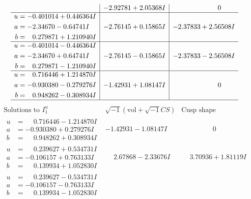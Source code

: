 \documentclass[1p]{elsarticle_modified}
\theoremstyle{definition}
\newcommand{\I}{\sqrt{-1}}
\begin{document}
$$\begin{array}{c|c|c}
 & -2.92781 + 2.05368 I & \phantom{-0.000000 } 0 \\ \hline\begin{aligned}
u &= -0.401014 + 0.446364 I \\
a &= -2.34670 - 0.64741 I \\
b &= \phantom{-}0.279871 + 1.210940 I\end{aligned}
 & -2.76145 + 0.15865 I & -2.37833 + 2.56508 I \\ \hline\begin{aligned}
u &= -0.401014 - 0.446364 I \\
a &= -2.34670 + 0.64741 I \\
b &= \phantom{-}0.279871 - 1.210940 I\end{aligned}
 & -2.76145 - 0.15865 I & -2.37833 - 2.56508 I \\ \hline\begin{aligned}
u &= \phantom{-}0.716446 + 1.214870 I \\
a &= -0.930380 - 0.279276 I \\
b &= \phantom{-}0.948262 - 0.308934 I\end{aligned}
 & -1.42931 + 1.08147 I & \phantom{-0.000000 } 0\\
 \hline 
 \end{array}$$\newpage$$\begin{array}{c|c|c}  
\text{Solutions to }I^u_{1}& \I (\text{vol} + \sqrt{-1}CS) & \text{Cusp shape}\\
 \hline 
\begin{aligned}
u &= \phantom{-}0.716446 - 1.214870 I \\
a &= -0.930380 + 0.279276 I \\
b &= \phantom{-}0.948262 + 0.308934 I\end{aligned}
 & -1.42931 - 1.08147 I & \phantom{-0.000000 } 0 \\ \hline\begin{aligned}
u &= \phantom{-}0.239627 + 0.534731 I \\
a &= -0.106157 + 0.763133 I \\
b &= \phantom{-}0.139934 + 1.052830 I\end{aligned}
 & \phantom{-}2.67868 - 2.33676 I & \phantom{-}3.70936 + 1.81119 I \\ \hline\begin{aligned}
u &= \phantom{-}0.239627 - 0.534731 I \\
a &= -0.106157 - 0.763133 I \\
b &= \phantom{-}0.139934 - 1.052830 I\end{aligned}

\end{array}$$
\end{document}
